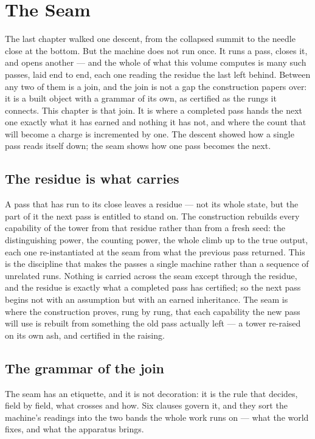 \chapter{The Seam}
\label{chap:the-seam}

The last chapter walked one descent, from the collapsed summit to the needle close at the bottom. But the
machine does not run once. It runs a pass, closes it, and opens another --- and the whole of what this
volume computes is many such passes, laid end to end, each one reading the residue the last left behind.
Between any two of them is a join, and the join is not a gap the construction papers over: it is a built
object with a grammar of its own, as certified as the rungs it connects. This chapter is that join. It is
where a completed pass hands the next one exactly what it has earned and nothing it has not, and where the
count that will become a charge is incremented by one. The descent showed how a single pass reads itself
down; the seam shows how one pass becomes the next.

\section{The residue is what carries}
\label{se:residue-is-what-carries}

A pass that has run to its close leaves a residue --- not its whole state, but the part of it the next pass
is entitled to stand on. The construction rebuilds every capability of the tower from that residue rather
than from a fresh seed: the distinguishing power, the counting power, the whole climb up to the true output,
each one re-instantiated at the seam from what the previous pass returned. This is the discipline that makes
the passes a single machine rather than a sequence of unrelated runs. Nothing is carried across the seam
except through the residue, and the residue is exactly what a completed pass has certified; so the next pass
begins not with an assumption but with an earned inheritance. The seam is where the construction proves, rung
by rung, that each capability the new pass will use is rebuilt from something the old pass actually left ---
a tower re-raised on its own ash, and certified in the raising.

\section{The grammar of the join}
\label{se:grammar-of-the-join}

The seam has an etiquette, and it is not decoration: it is the rule that decides, field by field, what
crosses and how. Six clauses govern it, and they sort the machine's readings into the two bands the whole
work runs on --- what the world fixes, and what the apparatus brings.

